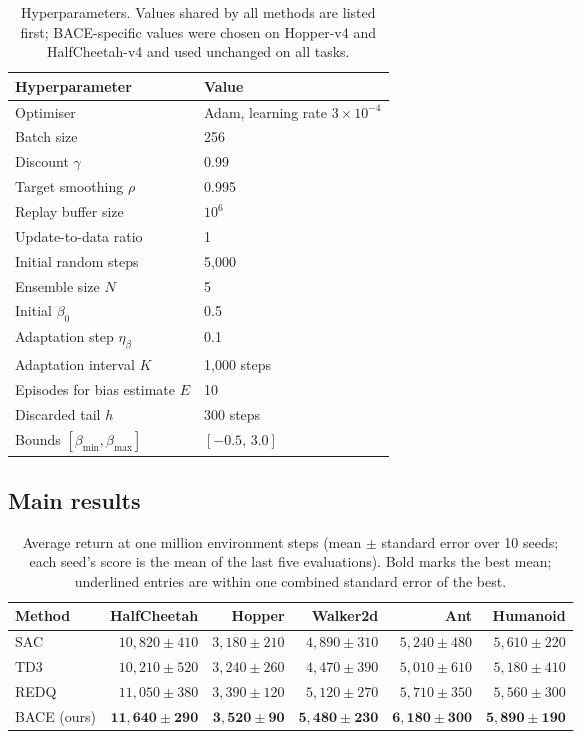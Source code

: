 \documentclass[10pt,twocolumn,letterpaper]{article}
\newcommand{\method}{\textsc{BACE}}
\begin{document}
\begin{table}[t]
\centering
\caption{Hyperparameters. Values shared by all methods are listed first; \method-specific values were chosen on Hopper-v4 and HalfCheetah-v4 and used unchanged on all tasks.}
\label{tab:hparams}
\small
\begin{tabular}{@{}ll@{}}
\toprule
Hyperparameter & Value \\
\midrule
Optimiser & Adam, learning rate $3\times10^{-4}$ \\
Batch size & 256 \\
Discount $\gamma$ & 0.99 \\
Target smoothing $\rho$ & 0.995 \\
Replay buffer size & $10^6$ \\
Update-to-data ratio & 1 \\
Initial random steps & 5,000 \\
\midrule
Ensemble size $N$ & 5 \\
Initial $\beta_0$ & 0.5 \\
Adaptation step $\eta_\beta$ & 0.1 \\
Adaptation interval $K$ & 1,000 steps \\
Episodes for bias estimate $E$ & 10 \\
Discarded tail $h$ & 300 steps \\
Bounds $[\beta_{\min},\beta_{\max}]$ & $[-0.5,\,3.0]$ \\
\bottomrule
\end{tabular}
\end{table}

\subsection{Main results}

\begin{table}[t]
\centering
\caption{Average return at one million environment steps (mean $\pm$ standard error over 10 seeds; each seed's score is the mean of the last five evaluations). Bold marks the best mean; underlined entries are within one combined standard error of the best.}
\label{tab:main}
\begin{tabular}{@{}lrrrrr@{}}
\toprule
Method & HalfCheetah & Hopper & Walker2d & Ant & Humanoid \\
\midrule
SAC  & $10{,}820 \pm 410$ & $3{,}180 \pm 210$ & $4{,}890 \pm 310$ & $5{,}240 \pm 480$ & \underline{$5{,}610 \pm 220$} \\
TD3  & $10{,}210 \pm 520$ & $3{,}240 \pm 260$ & $4{,}470 \pm 390$ & $5{,}010 \pm 610$ & $5{,}180 \pm 410$ \\
REDQ & $11{,}050 \pm 380$ & \underline{$3{,}390 \pm 120$} & $5{,}120 \pm 270$ & $5{,}710 \pm 350$ & \underline{$5{,}560 \pm 300$} \\
\method{} (ours) & $\mathbf{11{,}640 \pm 290}$ & $\mathbf{3{,}520 \pm 90}$ & $\mathbf{5{,}480 \pm 230}$ & $\mathbf{6{,}180 \pm 300}$ & $\mathbf{5{,}890 \pm 190}$ \\
\bottomrule
\end{tabular}
\end{table}
\end{document}
